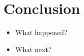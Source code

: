 \documentclass{article}
\begin{document}

\section{Conclusion}

\begin{itemize}
\item What happened?
\item What next?
\end{itemize}








\end{document}
